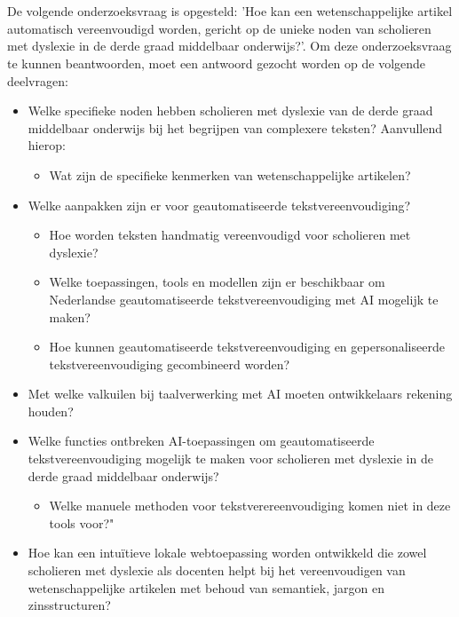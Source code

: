 \section{}%
\label{sec:onderzoeksvraag}

De volgende onderzoeksvraag is opgesteld: 'Hoe kan een wetenschappelijke artikel automatisch vereenvoudigd worden, gericht op de unieke noden van scholieren met dyslexie in de derde graad middelbaar onderwijs?'. Om deze onderzoeksvraag te kunnen beantwoorden, moet een antwoord gezocht worden op de volgende deelvragen:

\begin{itemize}
	\item Welke specifieke noden hebben scholieren met dyslexie van de derde graad middelbaar onderwijs bij het begrijpen van complexere teksten? Aanvullend hierop: 
	\begin{itemize}
		\item Wat zijn de specifieke kenmerken van wetenschappelijke artikelen?
	\end{itemize} 
	
	\item Welke aanpakken zijn er voor geautomatiseerde tekstvereenvoudiging?
	\begin{itemize}
		\item Hoe worden teksten handmatig vereenvoudigd voor scholieren met dyslexie?
		\item Welke toepassingen, tools en modellen zijn er beschikbaar om Nederlandse geautomatiseerde tekstvereenvoudiging met AI mogelijk te maken?
		\item Hoe kunnen geautomatiseerde tekstvereenvoudiging en gepersonaliseerde tekstvereenvoudiging gecombineerd worden?
	\end{itemize}

	\item Met welke valkuilen bij taalverwerking met AI moeten ontwikkelaars rekening
	houden?
	
	\item Welke functies ontbreken AI-toepassingen om geautomatiseerde tekstvereenvoudiging mogelijk te maken voor scholieren met dyslexie in de derde graad middelbaar onderwijs? 
	\begin{itemize}
		\item Welke manuele methoden voor tekstverereenvoudiging komen niet in deze tools voor?"
	\end{itemize}

	
	\item Hoe kan een intuïtieve lokale webtoepassing worden ontwikkeld die zowel scholieren met dyslexie als docenten helpt bij het vereenvoudigen van wetenschappelijke artikelen met behoud van semantiek, jargon en zinsstructuren?
\end{itemize}


